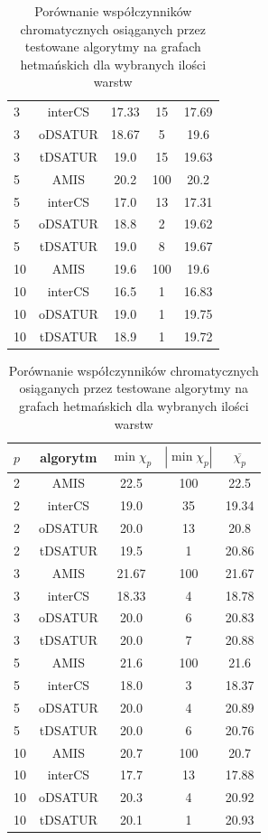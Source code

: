 \documentclass[10pt,a4paper]{article}
\begin{document}
\begin{table}[H]
\begin{minipage}{.5\linewidth}
\begin{tabular}{|l|c|c|c|c|}
				3 & interCS & 17.33 & 15 & 17.69 \\
				3 & oDSATUR & 18.67 & 5 & 19.6 \\
				3 & tDSATUR & 19.0 & 15 & 19.63 \\
				\hline
				5 & AMIS & 20.2 & 100 & 20.2 \\
				5 & interCS & 17.0 & 13 & 17.31 \\
				5 & oDSATUR & 18.8 & 2 & 19.62 \\
				5 & tDSATUR & 19.0 & 8 & 19.67 \\
				\hline
				10 & AMIS & 19.6 & 100 & 19.6 \\
				10 & interCS & 16.5 & 1 & 16.83 \\
				10 & oDSATUR & 19.0 & 1 & 19.75 \\
				10 & tDSATUR & 18.9 & 1 & 19.72 \\
				\hline
			\end{tabular}
			\caption{$Q(15)$}
		\end{minipage}
		\begin{minipage}{.5\linewidth}
			\centering
			\begin{tabular}{|l|c|c|c|c|}
				\hline
				\textbf{$p$} & \textbf{algorytm} & \textbf{$\min \chi_{p}$} & \textbf{$|\min \chi_{p}|$} & \textbf{$\overline{\chi_{p}}$} \\
				\hline
				2 & AMIS & 22.5 & 100 & 22.5 \\
				2 & interCS & 19.0 & 35 & 19.34 \\
				2 & oDSATUR & 20.0 & 13 & 20.8 \\
				2 & tDSATUR & 19.5 & 1 & 20.86 \\
				\hline
				3 & AMIS & 21.67 & 100 & 21.67 \\
				3 & interCS & 18.33 & 4 & 18.78 \\
				3 & oDSATUR & 20.0 & 6 & 20.83 \\
				3 & tDSATUR & 20.0 & 7 & 20.88 \\
				\hline
				5 & AMIS & 21.6 & 100 & 21.6 \\
				5 & interCS & 18.0 & 3 & 18.37 \\
				5 & oDSATUR & 20.0 & 4 & 20.89 \\
				5 & tDSATUR & 20.0 & 6 & 20.76 \\
				\hline
				10 & AMIS & 20.7 & 100 & 20.7 \\
				10 & interCS & 17.7 & 13 & 17.88 \\
				10 & oDSATUR & 20.3 & 4 & 20.92 \\
				10 & tDSATUR & 20.1 & 1 & 20.93 \\
				\hline
			\end{tabular}
			\caption{$Q(16)$}
		\end{minipage}
		\caption{Porównanie współczynników chromatycznych osiąganych przez testowane algorytmy na grafach hetmańskich dla wybranych ilości warstw }
	\end{table}
	
\end{document}
